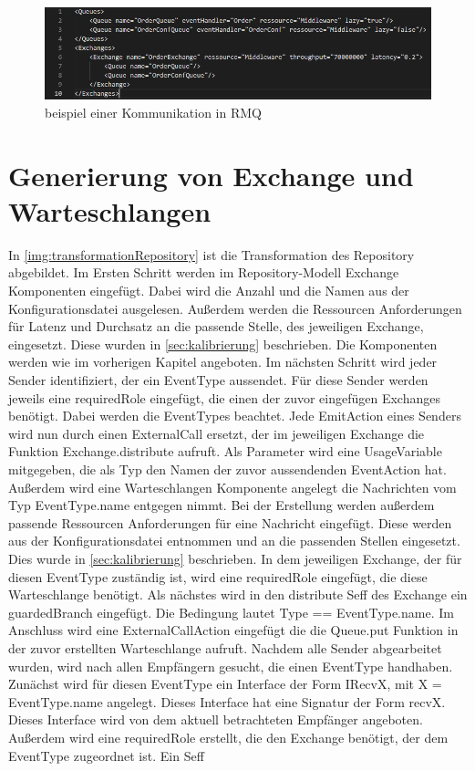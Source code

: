 \begin{figure}
\center
  \includegraphics[width=1\textwidth]{code/configExample.png}
  \caption{beispiel einer Kommunikation in RMQ}
  \label{img:configExample}
\end{figure}

\section{Generierung von Exchange und Warteschlangen}
In \autoref{img:transformationRepository} ist die Transformation des Repository abgebildet. Im Ersten Schritt werden im Repository-Modell Exchange Komponenten eingefügt. Dabei wird die Anzahl und die Namen aus der Konfigurationsdatei ausgelesen. Außerdem werden die Ressourcen Anforderungen für Latenz und Durchsatz an die passende Stelle, des jeweiligen Exchange, eingesetzt. Diese wurden in \autoref{sec:kalibrierung} beschrieben. Die Komponenten werden wie im vorherigen Kapitel angeboten. Im nächsten Schritt wird jeder Sender identifiziert, der ein EventType aussendet. Für diese Sender werden jeweils eine requiredRole eingefügt, die einen der zuvor eingefügen Exchanges benötigt. Dabei werden die EventTypes beachtet. Jede EmitAction eines Senders wird nun durch einen ExternalCall ersetzt, der im jeweiligen Exchange die Funktion Exchange.distribute aufruft. Als Parameter wird eine UsageVariable mitgegeben, die als Typ den Namen der zuvor aussendenden EventAction hat. Außerdem wird eine Warteschlangen Komponente angelegt die Nachrichten vom Typ EventType.name entgegen nimmt. Bei der Erstellung werden außerdem passende Ressourcen Anforderungen für eine Nachricht eingefügt. Diese werden aus der Konfigurationsdatei entnommen und an die passenden Stellen eingesetzt. Dies wurde in \autoref{sec:kalibrierung} beschrieben. In dem jeweiligen Exchange, der für diesen EventType zuständig ist, wird eine requiredRole eingefügt, die diese Warteschlange benötigt. Als nächstes wird in den distribute Seff des Exchange ein guardedBranch eingefügt. Die Bedingung lautet Type == EventType.name. Im Anschluss wird eine ExternalCallAction eingefügt die die Queue.put Funktion in der zuvor erstellten Warteschlange aufruft. Nachdem alle Sender abgearbeitet wurden, wird nach allen Empfängern gesucht, die einen EventType handhaben. Zunächst wird für diesen EventType ein Interface der Form IRecvX, mit X = EventType.name angelegt. Dieses Interface hat eine Signatur der Form recvX. Dieses Interface wird von dem aktuell betrachteten Empfänger angeboten. Außerdem wird eine requiredRole erstellt, die den Exchange benötigt, der dem EventType zugeordnet ist. Ein Seff 